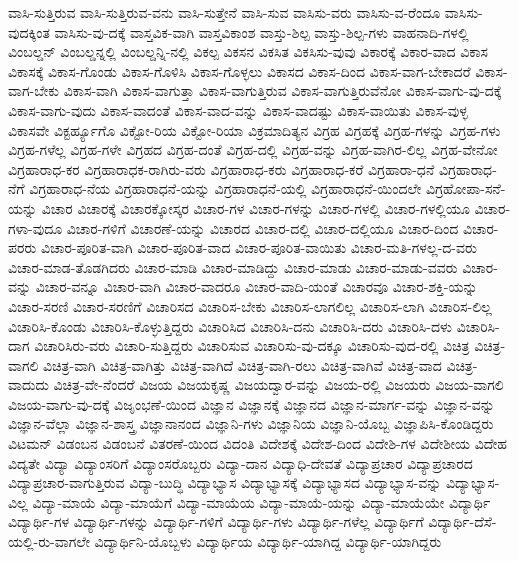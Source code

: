 {ವಾಸಿ-ಸುತ್ತಿರುವ
ವಾಸಿ-ಸುತ್ತಿರುವ-ವನು
ವಾಸಿ-ಸುತ್ತೇನೆ
ವಾಸಿ-ಸುವ
ವಾಸಿಸು-ವರು
ವಾಸಿಸು-ವ-ರೆಂದೂ
ವಾಸಿಸು-ವುದಕ್ಕಿಂತ
ವಾಸಿಸು-ವು-ದಕ್ಕೆ
ವಾಸ್ತವಿಕ-ವಾಗಿ
ವಾಸ್ತವಿಕಾಂಶ
ವಾಸ್ತು-ಶಿಲ್ಪ
ವಾಸ್ತು-ಶಿಲ್ಪ-ಗಳು
ವಾಹನಾದಿ-ಗಳಲ್ಲಿ
ವಿಂಬಲ್ಡನ್
ವಿಂಬಲ್ಡನ್ನಲ್ಲಿ
ವಿಂಬಲ್ಡನ್ನಿ-ನಲ್ಲಿ
ವಿಕಲ್ಪ
ವಿಕಸನ
ವಿಕಸಿತ
ವಿಕಸಿಸು-ವುವು
ವಿಕಾರಕ್ಕೆ
ವಿಕಾರ-ವಾದ
ವಿಕಾಸ
ವಿಕಾಸಕ್ಕೆ
ವಿಕಾಸ-ಗೊಂಡು
ವಿಕಾಸ-ಗೊಳಿಸಿ
ವಿಕಾಸ-ಗೊಳ್ಳಲು
ವಿಕಾಸದ
ವಿಕಾಸ-ದಿಂದ
ವಿಕಾಸ-ವಾಗ-ಬೇಕಾದರೆ
ವಿಕಾಸ-ವಾಗ-ಬೇಕು
ವಿಕಾಸ-ವಾಗಿ
ವಿಕಾಸ-ವಾಗುತ್ತಾ
ವಿಕಾಸ-ವಾಗುತ್ತಿರುವ
ವಿಕಾಸ-ವಾಗುತ್ತಿರುವೆನೋ
ವಿಕಾಸ-ವಾಗು-ವು-ದಕ್ಕೆ
ವಿಕಾಸ-ವಾಗು-ವುದು
ವಿಕಾಸ-ವಾದಂತೆ
ವಿಕಾಸ-ವಾದ-ವನ್ನು
ವಿಕಾಸ-ವಾದಷ್ಟು
ವಿಕಾಸ-ವಾಯಿತು
ವಿಕಾಸ-ವುಳ್ಳ
ವಿಕಾಸವೇ
ವಿಕ್ಟರ್ಹ್ಯೂಗೊ
ವಿಕ್ಟೋ-ರಿಯ
ವಿಕ್ಟೋ-ರಿಯಾ
ವಿಕ್ರಮಾದಿತ್ಯನ
ವಿಗ್ರಹ
ವಿಗ್ರಹಕ್ಕೆ
ವಿಗ್ರಹ-ಗಳನ್ನು
ವಿಗ್ರಹ-ಗಳು
ವಿಗ್ರಹ-ಗಳೆಲ್ಲ
ವಿಗ್ರಹ-ಗಳೇ
ವಿಗ್ರಹದ
ವಿಗ್ರಹ-ದಂತೆ
ವಿಗ್ರಹ-ದಲ್ಲಿ
ವಿಗ್ರಹ-ವನ್ನು
ವಿಗ್ರಹ-ವಾಗಿರ-ಲಿಲ್ಲ
ವಿಗ್ರಹ-ವೇನೋ
ವಿಗ್ರಹಾರಾಧ-ಕರ
ವಿಗ್ರಹಾರಾಧಕ-ರಾಗಿರು-ವರು
ವಿಗ್ರಹಾರಾಧ-ಕರು
ವಿಗ್ರಹಾರಾಧ-ಕರೆ
ವಿಗ್ರಹಾರಾ-ಧನೆ
ವಿಗ್ರಹಾರಾಧ-ನೆಗೆ
ವಿಗ್ರಹಾರಾಧ-ನೆಯ
ವಿಗ್ರಹಾರಾಧನೆ-ಯನ್ನು
ವಿಗ್ರಹಾರಾಧನೆ-ಯಲ್ಲಿ
ವಿಗ್ರಹಾರಾಧನೆ-ಯಿಂದಲೇ
ವಿಗ್ರಹೋಪಾ-ಸನೆ-ಯನ್ನು
ವಿಚಾರ
ವಿಚಾರಕ್ಕೆ
ವಿಚಾರಕ್ಕೋಸ್ಕರ
ವಿಚಾರ-ಗಳ
ವಿಚಾರ-ಗಳನ್ನು
ವಿಚಾರ-ಗಳಲ್ಲಿ
ವಿಚಾರ-ಗಳಲ್ಲಿಯೂ
ವಿಚಾರ-ಗಳಾ-ವುದೂ
ವಿಚಾರ-ಗಳಿಗೆ
ವಿಚಾರಣೆ-ಯನ್ನು
ವಿಚಾರದ
ವಿಚಾರ-ದಲ್ಲಿ
ವಿಚಾರ-ದಲ್ಲಿಯೂ
ವಿಚಾರ-ದಿಂದ
ವಿಚಾರ-ಪರರು
ವಿಚಾರ-ಪೂರಿತ-ವಾಗಿ
ವಿಚಾರ-ಪೂರಿತ-ವಾದ
ವಿಚಾರ-ಪೂರಿತ-ವಾಯಿತು
ವಿಚಾರ-ಮತಿ-ಗಳಲ್ಲ-ದ-ವರು
ವಿಚಾರ-ಮಾಡ-ತೊಡಗಿದರು
ವಿಚಾರ-ಮಾಡಿ
ವಿಚಾರ-ಮಾಡಿದ್ದು
ವಿಚಾರ-ಮಾಡು
ವಿಚಾರ-ಮಾಡು-ವವರು
ವಿಚಾರ-ವನ್ನು
ವಿಚಾರ-ವನ್ನೂ
ವಿಚಾರ-ವಾಗಿ
ವಿಚಾರ-ವಾದರೂ
ವಿಚಾರ-ವಾದಿ-ಯಂತೆ
ವಿಚಾರವೂ
ವಿಚಾರ-ಶಕ್ತಿ-ಯನ್ನು
ವಿಚಾರ-ಸರಣಿ
ವಿಚಾರ-ಸರಣಿಗೆ
ವಿಚಾರಿಸದ
ವಿಚಾರಿಸ-ಬೇಕು
ವಿಚಾರಿಸ-ಲಾಗಲಿಲ್ಲ
ವಿಚಾರಿಸ-ಲಾಗಿ
ವಿಚಾರಿಸ-ಲಿಲ್ಲ
ವಿಚಾರಿಸಿ-ಕೊಂಡು
ವಿಚಾರಿಸಿ-ಕೊಳ್ಳುತ್ತಿದ್ದರು
ವಿಚಾರಿಸಿದ
ವಿಚಾರಿಸಿ-ದನು
ವಿಚಾರಿಸಿ-ದರು
ವಿಚಾರಿಸಿ-ದಳು
ವಿಚಾರಿಸಿ-ದಾಗ
ವಿಚಾರಿಸಿರು-ವರು
ವಿಚಾರಿ-ಸುತ್ತಿದ್ದರು
ವಿಚಾರಿಸುವ
ವಿಚಾರಿಸು-ವು-ದಕ್ಕೂ
ವಿಚಾರಿಸು-ವುದ-ರಲ್ಲಿ
ವಿಚಿತ್ರ
ವಿಚಿತ್ರ-ವಾಗಲಿ
ವಿಚಿತ್ರ-ವಾಗಿ
ವಿಚಿತ್ರ-ವಾಗಿತ್ತು
ವಿಚಿತ್ರ-ವಾಗಿದೆ
ವಿಚಿತ್ರ-ವಾಗಿ-ರಲು
ವಿಚಿತ್ರ-ವಾಗಿವೆ
ವಿಚಿತ್ರ-ವಾದ
ವಿಚಿತ್ರ-ವಾದುದು
ವಿಚಿತ್ರ-ವೇ-ನೆಂದರೆ
ವಿಜಯ
ವಿಜಯಕೃಷ್ಣ
ವಿಜಯದ್ವಾರ-ವನ್ನು
ವಿಜಯ-ರಲ್ಲಿ
ವಿಜಯರು
ವಿಜಯ-ವಾಗಲಿ
ವಿಜಯ-ವಾಗು-ವು-ದಕ್ಕೆ
ವಿಜೃಂಭಣೆ-ಯಿಂದ
ವಿಜ್ಞಾನ
ವಿಜ್ಞಾನಕ್ಕೆ
ವಿಜ್ಞಾನದ
ವಿಜ್ಞಾನ-ಮಾರ್ಗ-ವನ್ನು
ವಿಜ್ಞಾನ-ವನ್ನು
ವಿಜ್ಞಾನ-ವೆಲ್ಲಾ
ವಿಜ್ಞಾನ-ಶಾಸ್ತ್ರ
ವಿಜ್ಞಾನಾನಂದ
ವಿಜ್ಞಾನಿ-ಗಳು
ವಿಜ್ಞಾನಿಯ
ವಿಜ್ಞಾನಿ-ಯೊಬ್ಬ
ವಿಜ್ಞಾಪಿಸಿ-ಕೊಂಡಿದ್ದರು
ವಿಟಮನ್
ವಿಡಂಬನ
ವಿಡಂಬನೆ
ವಿತರಣೆ-ಯಿಂದ
ವಿದಂತಿ
ವಿದೇಶಕ್ಕೆ
ವಿದೇಶ-ದಿಂದ
ವಿದೇಶಿ-ಗಳ
ವಿದೇಶೀಯ
ವಿದೇಹ
ವಿದ್ಯತೇ
ವಿದ್ಯಾ
ವಿದ್ಯಾಂಸರಿಗೆ
ವಿದ್ಯಾಂಸರೊಬ್ಬರು
ವಿದ್ಯಾ-ದಾನ
ವಿದ್ಯಾಧಿ-ದೇವತೆ
ವಿದ್ಯಾಪ್ರಚಾರ
ವಿದ್ಯಾಪ್ರಚಾರದ
ವಿದ್ಯಾಪ್ರಚಾರ-ವಾಗುತ್ತಿರುವ
ವಿದ್ಯಾ-ಬುದ್ಧಿ
ವಿದ್ಯಾಭ್ಯಾಸ
ವಿದ್ಯಾಭ್ಯಾಸಕ್ಕೆ
ವಿದ್ಯಾಭ್ಯಾಸದ
ವಿದ್ಯಾಭ್ಯಾಸ-ವನ್ನು
ವಿದ್ಯಾಭ್ಯಾಸ-ವಿಲ್ಲ
ವಿದ್ಯಾ-ಮಾಯೆ
ವಿದ್ಯಾ-ಮಾಯೆಗೆ
ವಿದ್ಯಾ-ಮಾಯೆಯ
ವಿದ್ಯಾ-ಮಾಯೆ-ಯನ್ನು
ವಿದ್ಯಾ-ಮಾಯೆಯೇ
ವಿದ್ಯಾರ್ಥಿ
ವಿದ್ಯಾರ್ಥಿ-ಗಳ
ವಿದ್ಯಾರ್ಥಿ-ಗಳನ್ನು
ವಿದ್ಯಾರ್ಥಿ-ಗಳಿಗೆ
ವಿದ್ಯಾರ್ಥಿ-ಗಳು
ವಿದ್ಯಾರ್ಥಿ-ಗಳೆಲ್ಲ
ವಿದ್ಯಾರ್ಥಿಗೆ
ವಿದ್ಯಾರ್ಥಿ-ದೆಸೆ-ಯಲ್ಲಿ-ರು-ವಾಗಲೇ
ವಿದ್ಯಾರ್ಥಿನಿ-ಯೊಬ್ಬಳು
ವಿದ್ಯಾರ್ಥಿಯ
ವಿದ್ಯಾರ್ಥಿ-ಯಾಗಿದ್ದ
ವಿದ್ಯಾರ್ಥಿ-ಯಾಗಿದ್ದರು
}
